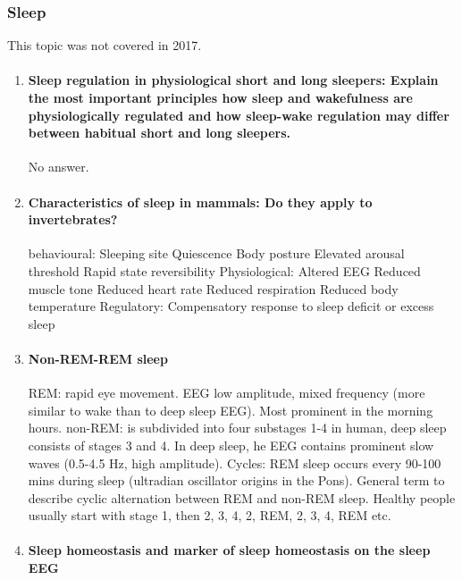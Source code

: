 \documentclass[12pt,article,oneside,a4paper]{memoir}
\begin{document}
\subsubsection{Sleep}
This topic was not covered in 2017.
\begin{enumerate}
\item \paragraph{Sleep regulation in physiological short and long sleepers:
Explain the most important principles how sleep and wakefulness are
physiologically regulated and how sleep-wake regulation may differ between
habitual short and long sleepers.}\label{question:sleep-physiological}
No answer.

\item \paragraph{Characteristics of sleep in mammals: Do they apply to
invertebrates?}
behavioural:
Sleeping site 
Quiescence
Body posture
Elevated arousal threshold
Rapid state reversibility
Physiological:
Altered EEG
Reduced muscle tone
Reduced heart rate
Reduced respiration
Reduced body temperature
Regulatory:
Compensatory response to sleep deficit or excess sleep

\item \paragraph{Non-REM-REM sleep}

REM: rapid eye movement. EEG low amplitude, mixed frequency (more similar to
wake than to deep sleep EEG). Most prominent in the morning hours.
non-REM: is subdivided into four substages 1-4 in human, deep sleep consists
of stages 3 and 4. In deep sleep, he EEG contains prominent slow waves (0.5-4.5
Hz, high amplitude).
Cycles: REM sleep occurs every 90-100 mins during sleep (ultradian oscillator
origins in the Pons). General term to describe cyclic alternation between REM
and non-REM sleep. Healthy people usually start with stage 1, then 2, 3, 4, 2,
REM, 2, 3, 4, REM etc.

\item \paragraph{Sleep homeostasis and marker of sleep homeostasis on the sleep
EEG}


\end{enumerate}
\end{document}

